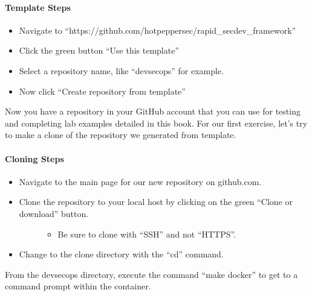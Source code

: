 \paragraph{Template Steps}
\begin{itemize}
      \item
            Navigate to ``https://github.com/hotpeppersec/rapid\_secdev\_framework''
      \item
            Click the green button ``Use this template''
      \item
            Select a repository name, like ``devsecops'' for
            example.
      \item
            Now click ``Create repository from template''
\end{itemize}

\justify{}
Now you have a repository in your GitHub account that you can use for
testing and completing lab examples detailed in this book. For our first
exercise, let's try to make a clone of the repository we generated from
template.


\paragraph{Cloning Steps}

\begin{itemize}
      \item
            Navigate to the main page for our new repository on github.com.
      \item
            \begin{description}
                  \item[Clone the repository to your local host by clicking on the green
                        ``Clone or download'' button.]
                        \begin{itemize}

                              \item
                                    Be sure to clone with ``SSH'' and not ``HTTPS''.
                        \end{itemize}
            \end{description}
      \item
            Change to the clone directory with the ``cd'' command.
\end{itemize}

\justify{}
From the devsecops directory, execute the command ``make docker'' to get to a command prompt within the container.

